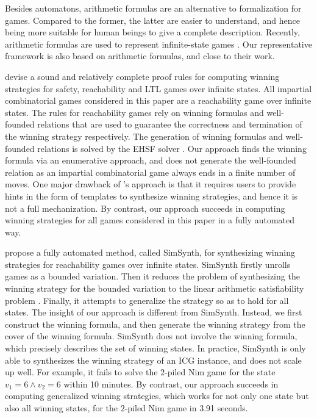 \documentclass[review]{elsarticle}
\begin{document}
Besides automatons, arithmetic formulas are an alternative to formalization for games.
Compared to the former, the latter are easier to understand, and hence being more suitable for human beings to give a complete description.
Recently, arithmetic formulas are used to represent infinite-state games \cite{BeyCPR2014,FarK2018,BaiCF2021,FaeP2023}.
Our representative framework is also based on arithmetic formulas, and close to their work. 

\citet{BeyCPR2014} devise a sound and relatively complete proof rules for computing winning strategies for safety, reachability and LTL games over infinite states.
All impartial combinatorial games considered in this paper are a reachability game over infinite states.
The rules for reachability games rely on winning formulas and well-founded relations that are used to guarantee the correctness and termination of the winning strategy respectively.
The generation of winning formulas and well-founded relations is solved by the EHSF solver \cite{BeyPR2013}.
Our approach finds the winning formula via an enumerative approach, and does not generate the well-founded relation as an impartial combinatorial game always ends in a finite number of moves.
One major drawback of \citeauthor{BeyCPR2014}'s approach is that it requires users to provide hints in the form of templates to synthesize winning strategies, and hence it is not a full mechanization.
By contrast, our approach succeeds in computing winning strategies for all games considered in this paper in a fully automated way.

\citet{FarK2018} propose a fully automated method, called SimSynth, for synthesizing winning strategies for reachability games over infinite states.
SimSynth firstly unrolls games as a bounded variation.
Then it reduces the problem of synthesizing the winning strategy for the bounded variation to the linear arithmetic satisfiability problem \cite{FarK2016}.
Finally, it attempts to generalize the strategy so as to hold for all states.
The insight of our approach is different from SimSynth.
Instead, we first construct the winning formula, and then generate the winning strategy from the cover of the winning formula.
SimSynth does not involve the winning formula, which precisely describes the set of winning states.
In practice, SimSynth is only able to synthesizes the winning strategy of an ICG instance, and does not scale up well.
For example, it fails to solve the $2$-piled Nim game for the state $v_1 = 6 \land v_2 = 6$ within 10 minutes.
By contrast, our approach succeeds in computing generalized winning strategies, which works for not only one state but also all winning states, for the $2$-piled Nim game in 3.91 seconds.
\end{document}
